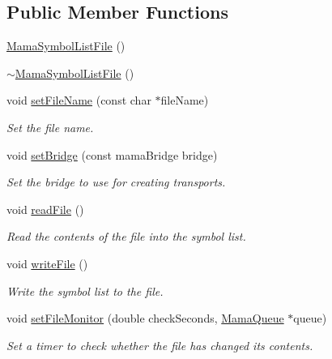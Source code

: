 \subsection*{Public Member Functions}
\begin{DoxyCompactItemize}
\item 
\hyperlink{classWombat_1_1MamaSymbolListFile_aa4ad63a7c2721d11bb28bfb93aea6ff8}{MamaSymbolListFile} ()
\item 
\hyperlink{classWombat_1_1MamaSymbolListFile_a6aaa6eee9c2f3602c8de355a09939323}{$\sim$MamaSymbolListFile} ()
\item 
void \hyperlink{classWombat_1_1MamaSymbolListFile_a2afcbdf48cf712c353e5038b0a64adf4}{setFileName} (const char $\ast$fileName)
\begin{DoxyCompactList}\small\item\em Set the file name. \item\end{DoxyCompactList}\item 
void \hyperlink{classWombat_1_1MamaSymbolListFile_a65239fe8a33d5754be76c26336256bed}{setBridge} (const mamaBridge bridge)
\begin{DoxyCompactList}\small\item\em Set the bridge to use for creating transports. \item\end{DoxyCompactList}\item 
void \hyperlink{classWombat_1_1MamaSymbolListFile_af0144c24817648b3caf0409b40dfea42}{readFile} ()
\begin{DoxyCompactList}\small\item\em Read the contents of the file into the symbol list. \item\end{DoxyCompactList}\item 
void \hyperlink{classWombat_1_1MamaSymbolListFile_a2823b1965b599a8f2d804d951ed255f4}{writeFile} ()
\begin{DoxyCompactList}\small\item\em Write the symbol list to the file. \item\end{DoxyCompactList}\item 
void \hyperlink{classWombat_1_1MamaSymbolListFile_aae324ceaa54ff90aa29c67671892f021}{setFileMonitor} (double checkSeconds, \hyperlink{classWombat_1_1MamaQueue}{MamaQueue} $\ast$queue)
\begin{DoxyCompactList}\small\item\em Set a timer to check whether the file has changed its contents. \item\end{DoxyCompactList}\end{DoxyCompactItemize}


